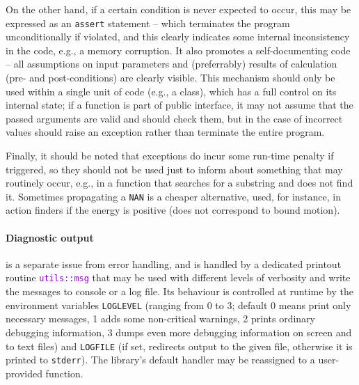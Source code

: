 \documentclass[12pt]{article}
\newcommand{\ttt}[1]{\textcolor{darkviolet}{\texttt{#1}}}
\begin{document}
On the other hand, if a certain condition is never expected to occur, this may be expressed as an \texttt{assert} statement -- which terminates the program unconditionally if violated, and this clearly indicates some internal inconsistency in the code, e.g., a memory corruption. It also promotes a self-documenting code -- all assumptions on input parameters and (preferrably) results of calculation (pre- and post-conditions) are clearly visible. This mechanism should only be used within a single unit of code (e.g., a class), which has a full control on its internal state; if a function is part of public interface, it may not assume that the passed arguments are valid and should check them, but in the case of incorrect values should raise an exception rather than terminate the entire program.

Finally, it should be noted that exceptions do incur some run-time penalty if triggered, so they should not be used just to inform about something that may routinely occur, e.g., in a function that searches for a substring and does not find it. Sometimes propagating a \texttt{NAN} is a cheaper alternative, used, for instance, in action finders if the energy is positive (does not correspond to bound motion).

\paragraph{Diagnostic output}  is a separate issue from error handling, and is handled by a dedicated printout routine \ttt{utils::msg} that may be used with different levels of verbosity and write the messages to console or a log file. Its behaviour is controlled at runtime by the environment variables \texttt{LOGLEVEL} (ranging from 0 to 3; default 0 means print only necessary messages, 1 adds some non-critical warnings, 2 prints ordinary debugging information, 3 dumps even more debugging information on screen and to text files) and \texttt{LOGFILE} (if set, redirects output to the given file, otherwise it is printed to \texttt{stderr}). The library's default handler may be reassigned to a user-provided function.
\end{document}
